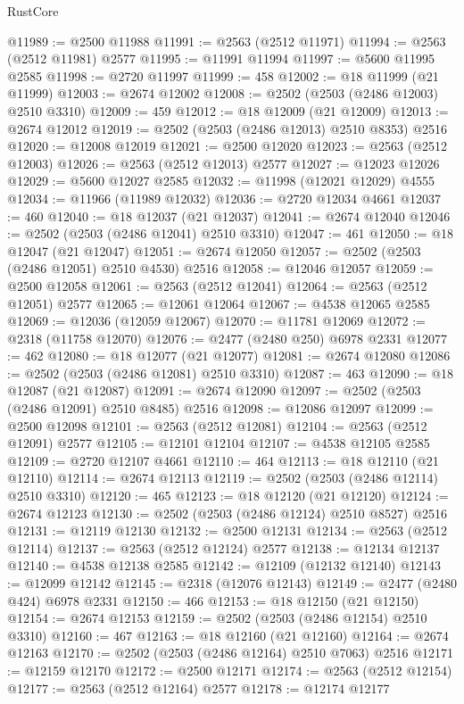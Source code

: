 \begin{lexlean}{RustCore}
\begin{coremodule}
@11989 := @2500 @11988
@11991 := @2563 (@2512 @11971)
@11994 := @2563 (@2512 @11981) @2577
@11995 := @11991 @11994
@11997 := @5600 @11995 @2585
@11998 := @2720 @11997
@11999 := 458
@12002 := @18 @11999 (@21 @11999)
@12003 := @2674 @12002
@12008 := @2502 (@2503 (@2486 @12003) @2510 @3310)
@12009 := 459
@12012 := @18 @12009 (@21 @12009)
@12013 := @2674 @12012
@12019 := @2502 (@2503 (@2486 @12013) @2510 @8353) @2516
@12020 := @12008 @12019
@12021 := @2500 @12020
@12023 := @2563 (@2512 @12003)
@12026 := @2563 (@2512 @12013) @2577
@12027 := @12023 @12026
@12029 := @5600 @12027 @2585
@12032 := @11998 (@12021 @12029) @4555
@12034 := @11966 (@11989 @12032)
@12036 := @2720 @12034 @4661
@12037 := 460
@12040 := @18 @12037 (@21 @12037)
@12041 := @2674 @12040
@12046 := @2502 (@2503 (@2486 @12041) @2510 @3310)
@12047 := 461
@12050 := @18 @12047 (@21 @12047)
@12051 := @2674 @12050
@12057 := @2502 (@2503 (@2486 @12051) @2510 @4530) @2516
@12058 := @12046 @12057
@12059 := @2500 @12058
@12061 := @2563 (@2512 @12041)
@12064 := @2563 (@2512 @12051) @2577
@12065 := @12061 @12064
@12067 := @4538 @12065 @2585
@12069 := @12036 (@12059 @12067)
@12070 := @11781 @12069
@12072 := @2318 (@11758 @12070)
@12076 := @2477 (@2480 @250) @6978 @2331
@12077 := 462
@12080 := @18 @12077 (@21 @12077)
@12081 := @2674 @12080
@12086 := @2502 (@2503 (@2486 @12081) @2510 @3310)
@12087 := 463
@12090 := @18 @12087 (@21 @12087)
@12091 := @2674 @12090
@12097 := @2502 (@2503 (@2486 @12091) @2510 @8485) @2516
@12098 := @12086 @12097
@12099 := @2500 @12098
@12101 := @2563 (@2512 @12081)
@12104 := @2563 (@2512 @12091) @2577
@12105 := @12101 @12104
@12107 := @4538 @12105 @2585
@12109 := @2720 @12107 @4661
@12110 := 464
@12113 := @18 @12110 (@21 @12110)
@12114 := @2674 @12113
@12119 := @2502 (@2503 (@2486 @12114) @2510 @3310)
@12120 := 465
@12123 := @18 @12120 (@21 @12120)
@12124 := @2674 @12123
@12130 := @2502 (@2503 (@2486 @12124) @2510 @8527) @2516
@12131 := @12119 @12130
@12132 := @2500 @12131
@12134 := @2563 (@2512 @12114)
@12137 := @2563 (@2512 @12124) @2577
@12138 := @12134 @12137
@12140 := @4538 @12138 @2585
@12142 := @12109 (@12132 @12140)
@12143 := @12099 @12142
@12145 := @2318 (@12076 @12143)
@12149 := @2477 (@2480 @424) @6978 @2331
@12150 := 466
@12153 := @18 @12150 (@21 @12150)
@12154 := @2674 @12153
@12159 := @2502 (@2503 (@2486 @12154) @2510 @3310)
@12160 := 467
@12163 := @18 @12160 (@21 @12160)
@12164 := @2674 @12163
@12170 := @2502 (@2503 (@2486 @12164) @2510 @7063) @2516
@12171 := @12159 @12170
@12172 := @2500 @12171
@12174 := @2563 (@2512 @12154)
@12177 := @2563 (@2512 @12164) @2577
@12178 := @12174 @12177

\end{coremodule}
\end{lexlean}

